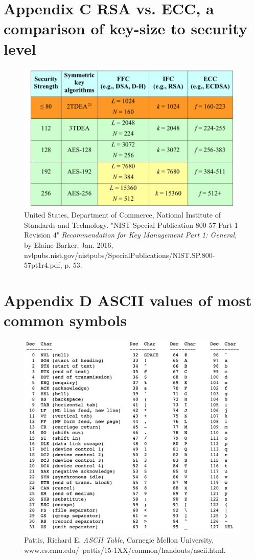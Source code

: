 \documentclass[a4paper,12pt]{article}
\theoremstyle{definition}
\begin{document}
\section*{Appendix C \hspace{0.5em} RSA vs. ECC, a comparison of key-size to security level} 
\begin{figure}[h]
	\captionsetup{labelformat=empty}
	\caption{United States, Department of Commerce, National Institute of Standards and Technology. "NIST Special Publication 800-57 Part 1 Revision 4" \textit{Recommendation for Key Management Part 1: General,} by Elaine Barker, Jan. 2016, nvlpubs.nist.gov/nistpubs/SpecialPublications/NIST.SP.800-57pt1r4.pdf, p. 53.}
	\centering
	\includegraphics[width=0.9\linewidth]{rsavsecc}
\end{figure}

\newpage
\section*{Appendix D \hspace{0.5em} ASCII values of most common symbols} \label{app:ascii}

\begin{figure}[!htb]
	\captionsetup{labelformat=empty}
     \caption{Pattis, Richard E. \textit{ASCII Table}, Carnegie Mellon University, www.cs.cmu.edu/~pattis/15-1XX/common/handouts/ascii.html.}
	 \centering
     \includegraphics[width=\linewidth]{ascii}
\end{figure}
\end{document}
